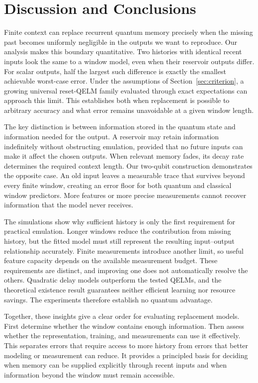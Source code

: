 \section{Discussion and Conclusions}
\label{sec:summary}

Finite context can replace recurrent quantum memory precisely when the
missing past becomes uniformly negligible in the outputs we want to reproduce.
Our analysis makes this boundary quantitative. Two histories with identical
recent inputs look the same to a window model, even when their reservoir
outputs differ. For scalar outputs, half the largest such difference is
exactly the smallest achievable worst-case error. Under the assumptions of
Section~\ref{sec:criterion}, a growing universal reset-QELM family evaluated
through exact expectations can approach this limit. This establishes both
when replacement is possible to arbitrary accuracy and what error remains
unavoidable at a given window length.

The key distinction is between information stored in the quantum state and
information needed for the output. A reservoir may retain information
indefinitely without obstructing emulation, provided that no future inputs
can make it affect the chosen outputs. When relevant memory fades, its decay
rate determines the required context length. Our two-qubit construction
demonstrates the opposite case. An old input leaves a measurable trace that
survives beyond every finite window, creating an error floor for both quantum
and classical window predictors. More features or more precise measurements
cannot recover information that the model never receives.

The simulations show why sufficient history is only the first requirement
for practical emulation. Longer windows reduce the contribution from missing
history, but the fitted model must still represent the resulting input--output
relationship accurately. Finite measurements introduce another limit, so
useful feature capacity depends on the available measurement budget. These
requirements are distinct, and improving one does not automatically resolve
the others. Quadratic delay models outperform the tested QELMs, and the
theoretical existence result guarantees neither efficient learning nor
resource savings. The experiments therefore establish no quantum advantage.

Together, these insights give a clear order for evaluating replacement models.
First determine whether the window contains enough information. Then assess
whether the representation, training, and measurements can use it effectively.
This separates errors that require access to more history from errors that
better modeling or measurement can reduce. It provides a principled basis
for deciding when memory can be supplied explicitly through recent inputs
and when information beyond the window must remain accessible.
